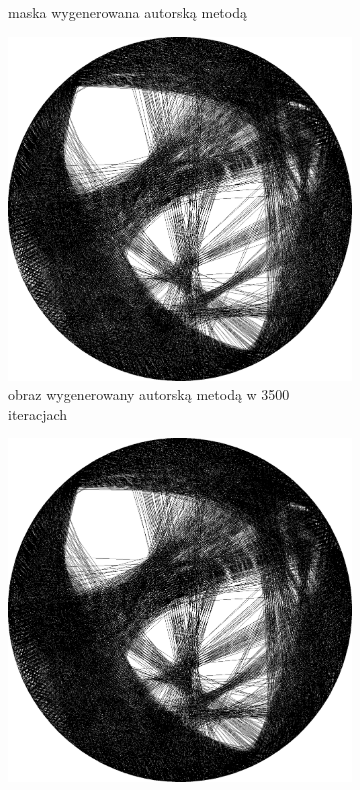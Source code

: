\begin{figure}[H]
\begin{subfigure}{0.23\textwidth}
            \caption{maska wygenerowana autorską metodą\\\hphantom{ }}
            \label{comp-comp-magdalene-l}
        \end{subfigure}
        \begin{subfigure}{0.23\textwidth}
            \centering
            \includegraphics[width = \textwidth]{img/6-comp/magdalene_e_i3500_c20_inv0_bg10_obj1_ed1.png}
            \caption{obraz wygenerowany autorską metodą w 3500 iteracjach}
            \label{comp-comp-magdalene-m}
        \end{subfigure}
        \begin{subfigure}{0.23\textwidth}
            \centering
            \includegraphics[width = \textwidth]{img/6-comp/magdalene_e_i4000_c20_inv0_bg10_obj1_ed1.png}

\end{subfigure}
\end{figure}
